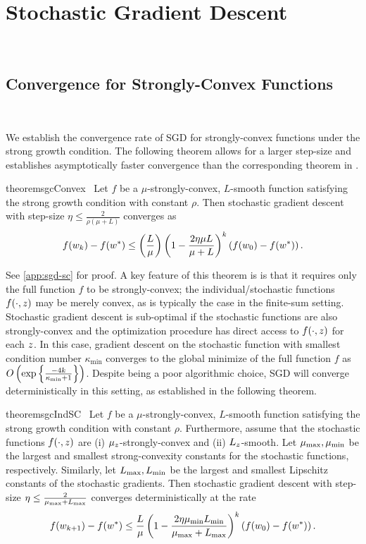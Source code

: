 
\chapter{Stochastic Gradient Descent}~\label{ch:sgd}


\section{Convergence for Strongly-Convex Functions}~\label{sec:sgd-sc}

We establish the convergence rate of SGD for strongly-convex functions under the strong growth condition. The following theorem allows for a larger step-size and establishes asymptotically faster convergence than the corresponding theorem in \citet{vaswani2019fast}.

\begin{restatable}{theorem}{sgcConvex}~\label{thm:sgc-convex}
    Let \( f \) be a \( \mu \)-strongly-convex, \( L \)-smooth function satisfying the strong growth condition with constant \( \rho \).
    Then stochastic gradient descent with step-size \( \eta \leq \frac{2}{\rho(\mu + L)} \) converges as 
    \[ f(w_k) - f(w^*) \leq \left(\frac{L}{\mu}\right)\left(1 - \frac{2\eta \mu L}{\mu + L}\right)^k \left(f(w_0) - f(w^*)\right). \] 
\end{restatable}

See \autoref{app:sgd-sc} for proof.
A key feature of this theorem is is that it requires only the full function \( f \) to be strongly-convex; the individual/stochastic functions \( f(\cdot, z) \) may be merely convex, as is typically the case in the finite-sum setting.
Stochastic gradient descent is sub-optimal if the stochastic functions are also strongly-convex and the optimization procedure has direct access to \( f(\cdot, z ) \) for each \( z \).
In this case, gradient descent on the stochastic function with smallest condition number \( \kappa_{\text{min}} \) converges to the global minimize of the full function \( f \) as \( O\left(\exp\left\{\frac{-4 k}{\kappa_{\text{min}} + 1}\right\}\right) \).
Despite being a poor algorithmic choice, SGD will converge deterministically in this setting, as established in the following theorem.

\begin{restatable}{theorem}{sgcIndSC}~\label{thm:sgc-ind-sc}
    Let \( f \) be a \( \mu \)-strongly-convex, \( L \)-smooth function satisfying the strong growth condition with constant \( \rho \).
    Furthermore, assume that the stochastic functions \( f(\cdot, z) \) are (i) \( \mu_z \)-strongly-convex and (ii) \( L_z \)-smooth.
    Let \( \mu_{\text{max}}, \mu_{\text{min}} \) be the largest and smallest strong-convexity constants for the stochastic functions, respectively.
    Similarly, let \( L_{\text{max}}, L_{\text{min}} \) be the largest and smallest Lipschitz constants of the stochastic gradients.
    Then stochastic gradient descent with step-size \( \eta \leq \frac{2}{\mu_{\text{max}} + L_{\text{max}}} \) converges deterministically at the rate 
    \[ f(w_{k+1}) - f(w^*) \leq \frac{L}{\mu} \left(1 - \frac{2 \eta \mu_{\text{min}} L_{\text{min}}}{\mu_{\text{max}} + L_{\text{max}}}\right)^k \left(f(w_0) - f(w^*)\right). \] 
\end{restatable}


